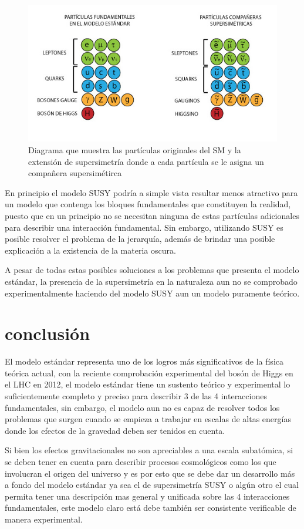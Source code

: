 \documentclass[journal]{IEEEtran}
\begin{document}
\begin{figure}[!htb]
\centering
\includegraphics[width=\linewidth,height=6 cm]{Supersimetria.jpg}
\caption{Diagrama que  muestra las partículas originales del SM y la extensión de supersimetría donde a cada partícula se le asigna un compañera supersimétirca}
\label{SUSY}
\end{figure}


En principio el modelo SUSY podría a simple vista resultar menos atractivo para un modelo que contenga los bloques fundamentales que constituyen la realidad, puesto que en un principio no se necesitan ninguna de estas partículas adicionales para describir una interacción fundamental. Sin embargo, utilizando SUSY es posible resolver el problema de la jerarquía, además de brindar una posible explicación a la existencia de la materia oscura.

A pesar de todas estas posibles soluciones a los problemas que presenta el modelo estándar, la presencia de la supersimetría en la naturaleza aun no se comprobado experimentalmente haciendo del modelo SUSY aun un modelo puramente teórico. 



\section{conclusión}

El modelo estándar representa uno de los logros más significativos de la física teórica actual, con la reciente comprobación experimental del bosón de Higgs en el LHC en 2012, el modelo estándar tiene un sustento teórico y experimental lo suficientemente completo y preciso para describir 3 de las 4 interacciones fundamentales, sin embargo, el modelo aun no es capaz de resolver todos los problemas que surgen cuando se empieza a trabajar en escalas de altas energías donde los efectos de la gravedad deben ser tenidos en cuenta.

Si bien los efectos gravitacionales no son apreciables a una escala subatómica, si se deben tener en cuenta para describir procesos cosmológicos como los que involucran el origen del universo y es por esto que se debe dar un desarrollo más a fondo del modelo estándar ya sea el de supersimetría SUSY o algún otro el cual permita tener una descripción mas general y unificada sobre las 4 interacciones fundamentales, este modelo claro está debe también ser consistente verificable de manera experimental.
\end{document}
